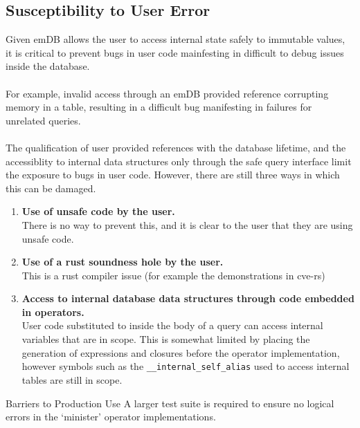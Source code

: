 \subsection{Susceptibility to User Error}
Given emDB allows the user to access internal state safely to immutable values, it is critical to
prevent bugs in user code mainfesting in difficult to debug issues inside the database.
\\
\\ For example, invalid access through an emDB provided reference corrupting memory in a table,
resulting in a difficult bug manifesting in failures for unrelated queries.
\\
\\ The qualification of user provided references with the database lifetime, and the accessiblity to
internal data structures only through the safe query interface limit the exposure to bugs in user code.
However, there are still three ways in which this can be damaged.
\begin{enumerate}
    \setlength\itemsep{0em}
    \item {
          \textbf{Use of unsafe code by the user.} \\
          There is no way to prevent this, and it is clear to the user that they are using unsafe code.
          }
    \item {
          \textbf{Use of a rust soundness hole by the user.} \\
          This is a rust compiler issue (for example the demonstrations in cve-rs\cite{CVERS})
          }
    \item {
          \textbf{Access to internal database data structures through code embedded in operators.} \\
          User code substituted to inside the body of a query
          can access internal variables that are in scope. This is somewhat limited by placing the generation of expressions and closures
          before the operator implementation, however symbols such as the \texttt{__internal_self_alias} used to access internal
          tables are still in scope.
          }
\end{enumerate}

\begin{futurebox}{Barriers to Production Use}
    A larger test suite is required to ensure no logical errors in the `minister' operator implementations.
\end{futurebox}

